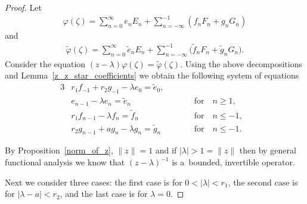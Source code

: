 \documentclass[11pt]{article}
\numberwithin{equation}{section}
\begin{document}
\begin{proof}
Let
\begin{gather*}
\varphi(\zeta)=\sum\limits_{n=0}^\infty e_n E_n+\sum\limits_{n=-\infty}^{-1}(f_nF_n+g_nG_n)
\end{gather*}
and
\begin{gather*}
\tilde{\varphi}(\zeta)=\sum\limits_{n=0}^\infty \tilde{e}_n E_n+\sum\limits_{n=-\infty}^{-1}\big(\tilde{f}_nF_n+\tilde{g}_nG_n\big).
\end{gather*}
Consider the equation $(z-\lambda)\varphi(\zeta)=\tilde{\varphi}(\zeta)$.
Using the above decompositions and Lemma~\ref{z_z_star_coefficients} we obtain the following system of equations
\begin{alignat}{3}
&  r_1f_{-1}+r_2g_{-1}-\lambda e_0=\tilde{e}_0,\qquad &&&\nonumber
\\
& e_{n-1}-\lambda e_n=\tilde{e}_n \quad &&\text{for} \quad n\ge1, &\nonumber
\\
& r_1f_{n-1}-\lambda f_n=\tilde{f}_n \quad &&\text{for} \quad n\le-1,&\nonumber
\\
 & r_2g_{n-1}+ag_n-\lambda g_n=\tilde{g}_n \quad &&\text{for} \quad  n\le-1. & \label{resolvent_system}
\end{alignat}

By Proposition~\ref{norm_of_z}, $\|z\|=1$ and if $|\lambda|>1=\|z\|$ then by general functional analysis we know that
$(z-\lambda)^{-1}$ is a~bounded, invertible operator.

Next we consider three cases: the f\/irst case is for $0<|\lambda|<r_1$, the second case is for $|\lambda-a|<r_2$, and the
last case is for $\lambda=0$.


\end{proof}
\end{document}
